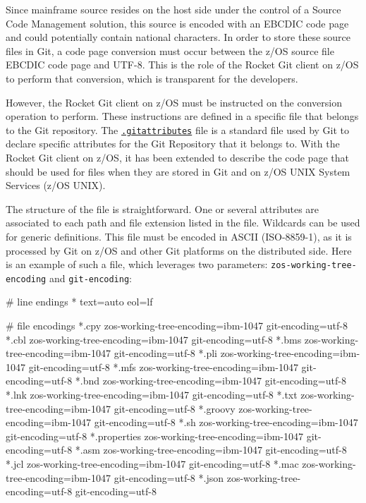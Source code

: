 \documentclass[
  letterpaper,
  DIV=11,
  numbers=noendperiod]{scrartcl}
\newenvironment{Shaded}{\begin{snugshade}}{\end{snugshade}}
\newcommand{\NormalTok}[1]{\textcolor[rgb]{0.00,0.23,0.31}{#1}}
\begin{document}
Since mainframe source resides on the host side under the control of a
Source Code Management solution, this source is encoded with an EBCDIC
code page and could potentially contain national characters. In order to
store these source files in Git, a code page conversion must occur
between the z/OS source file EBCDIC code page and UTF-8. This is the
role of the Rocket Git client on z/OS to perform that conversion, which
is transparent for the developers.

However, the Rocket Git client on z/OS must be instructed on the
conversion operation to perform. These instructions are defined in a
specific file that belongs to the Git repository. The
\href{https://www.git-scm.com/docs/gitattributes}{\texttt{.gitattributes}}
file is a standard file used by Git to declare specific attributes for
the Git Repository that it belongs to. With the Rocket Git client on
z/OS, it has been extended to describe the code page that should be used
for files when they are stored in Git and on z/OS UNIX System Services
(z/OS UNIX).

The structure of the file is straightforward. One or several attributes
are associated to each path and file extension listed in the file.
Wildcards can be used for generic definitions. This file must be encoded
in ASCII (ISO-8859-1), as it is processed by Git on z/OS and other Git
platforms on the distributed side. Here is an example of such a file,
which leverages two parameters: \texttt{zos-working-tree-encoding} and
\texttt{git-encoding}:

\begin{Shaded}
\begin{Highlighting}[]
\NormalTok{\# line endings}
\NormalTok{* text=auto eol=lf}

\NormalTok{\# file encodings}
\NormalTok{*.cpy zos{-}working{-}tree{-}encoding=ibm{-}1047 git{-}encoding=utf{-}8}
\NormalTok{*.cbl zos{-}working{-}tree{-}encoding=ibm{-}1047 git{-}encoding=utf{-}8}
\NormalTok{*.bms zos{-}working{-}tree{-}encoding=ibm{-}1047 git{-}encoding=utf{-}8}
\NormalTok{*.pli zos{-}working{-}tree{-}encoding=ibm{-}1047 git{-}encoding=utf{-}8}
\NormalTok{*.mfs zos{-}working{-}tree{-}encoding=ibm{-}1047 git{-}encoding=utf{-}8}
\NormalTok{*.bnd zos{-}working{-}tree{-}encoding=ibm{-}1047 git{-}encoding=utf{-}8}
\NormalTok{*.lnk zos{-}working{-}tree{-}encoding=ibm{-}1047 git{-}encoding=utf{-}8}
\NormalTok{*.txt zos{-}working{-}tree{-}encoding=ibm{-}1047 git{-}encoding=utf{-}8}
\NormalTok{*.groovy zos{-}working{-}tree{-}encoding=ibm{-}1047 git{-}encoding=utf{-}8}
\NormalTok{*.sh zos{-}working{-}tree{-}encoding=ibm{-}1047 git{-}encoding=utf{-}8}
\NormalTok{*.properties zos{-}working{-}tree{-}encoding=ibm{-}1047 git{-}encoding=utf{-}8}
\NormalTok{*.asm zos{-}working{-}tree{-}encoding=ibm{-}1047 git{-}encoding=utf{-}8}
\NormalTok{*.jcl zos{-}working{-}tree{-}encoding=ibm{-}1047 git{-}encoding=utf{-}8}
\NormalTok{*.mac zos{-}working{-}tree{-}encoding=ibm{-}1047 git{-}encoding=utf{-}8}
\NormalTok{*.json zos{-}working{-}tree{-}encoding=utf{-}8 git{-}encoding=utf{-}8}
\end{Highlighting}
\end{Shaded}
\end{document}
